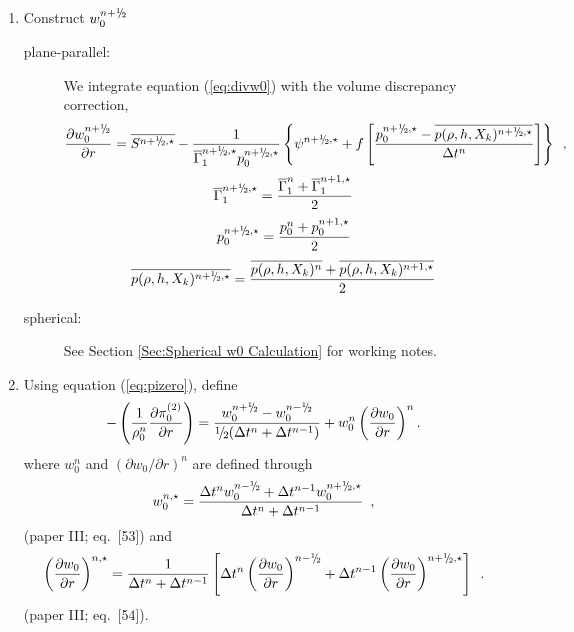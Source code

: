 \begin{description}
\begin{enumerate}
\item Construct $w_0^{\nph}$

\begin{description}

\item[plane-parallel:] We integrate equation (\ref{eq:divw0}) with the 
volume discrepancy correction,
\begin{equation}
\frac{\partial w_0^{\nph}}{\partial r} = 
\overline{S^{\nph,\star}} - \frac{1}{\gammabar^{\nph,\star} p_0^{\nph,\star}}
\left\{ \psi^{\nph,\star} + f \left[\frac{p_0^{\nph,\star} - \overline{p(\rho,h,X_k)^{\nph,\star}}}{\Delta t^n}\right]\right\}
\enskip ,
\end{equation}
\begin{equation}
\gammabar^{\nph,\star} = \frac{\gammabar^{n} + \gammabar^{n+1,\star}}{2}
\end{equation}
\begin{equation}
p_0^{\nph,\star} = \frac{p_0^{n} + p_0^{n+1,\star}}{2}
\end{equation}
\begin{equation}
\overline{p(\rho,h,X_k)^{\nph,\star}} = 
\frac{\overline{p(\rho,h,X_k)^n} + \overline{p(\rho,h,X_k)^{n+1,\star}}}{2}
\end{equation}

\item[spherical:] See Section \ref{Sec:Spherical w0 Calculation} for working notes.

\end{description}



\item Using equation (\ref{eq:pizero}), define
\begin{equation}
-\left ( \frac{1}{\rho_0^n} \frac{\partial \pizerotwo}{\partial r} \right ) = 
\frac{w_0^{\nph} - w_0^\nmh}{\myhalf(\dt^n+\dt^{n-1})} 
+ w_0^n \left(\frac{\partial w_0}{\partial r}\right)^n.
\end{equation}
where $w_0^n$ and $(\partial w_0 / \partial r)^{n}$ are defined through
\begin{equation}
w_0^{n,\star} = \frac{\dt^{n} w_0^{\nmh} + \dt^{n-1} w_0^{\nph,\star}}{\dt^n+\dt^{n-1}}\enskip,\label{eq:w0nstar}
\end{equation}
(paper III; eq.~[53]) and
\begin{equation}
\left(\frac{\partial w_0}{\partial r}\right)^{n,\star} = \frac{1}{\dt^n+\dt^{n-1} } \left [ \dt^{n} \left(\frac{\partial w_0 }{ \partial r}\right)^{\nmh}
+ \dt^{n-1} \left(\frac{\partial w_0 }{ \partial r}\right)^{\nph,\star} \right ] \enskip.\label{eq:dw0drnstar}
\end{equation}
(paper III; eq.~[54]).


\end{enumerate}
\end{description}
